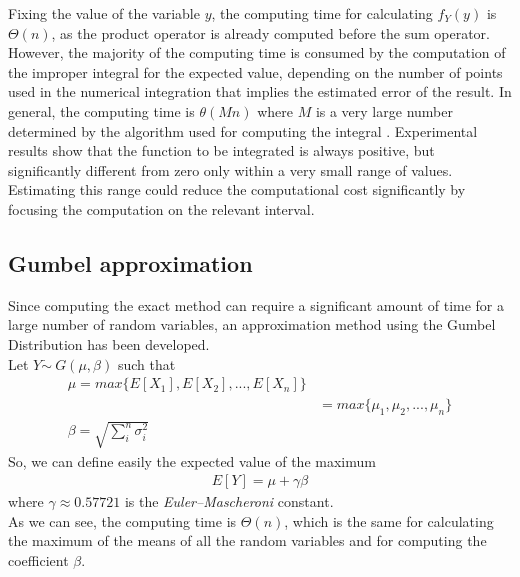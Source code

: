 Fixing the value of the variable $y$, the computing time for calculating $f_Y(y)$ is $\Theta(n)$, as the product operator is already computed before the sum operator. However, the majority of the computing time is consumed by the computation of the improper integral for the expected value, depending on the number of points used in the numerical integration that implies the estimated error of the result. In general, the computing time is $\theta(M n)$ where $M$ is a very large number determined by the algorithm used for computing the integral \cite{2020SciPy-NMeth}.
Experimental results show that the function to be integrated is always positive, but significantly different from zero only within a very small range of values. Estimating this range could reduce the computational cost significantly by focusing the computation on the relevant interval.

\subsection{Gumbel approximation}
Since computing the exact method can require a significant amount of time for a large number of random variables, an approximation method using the Gumbel Distribution has been developed. \\
Let $Y \dot \sim \ G(\mu, \beta)$ such that
\begin{align*}
	\mu = max\{E[X_1], E[X_2], ..., E[X_n]\} \\
	&= max\{\mu_1, \mu_2, ..., \mu_n\} \tag*{(since $X_i \sim N(\mu_i, \sigma_i^2)$)} \\
	\beta = \sqrt{\sum_{i}^n{\sigma_i^2}}
\end{align*}
So, we can define easily the expected value of the maximum
\begin{align*}
	E[Y] = \mu + \gamma \beta
\end{align*}
where $\gamma \approx 0.57721$ is the \textit{Euler–Mascheroni} constant. \\
As we can see, the computing time is $\Theta(n)$, which is the same for calculating the maximum of the means of all the random variables and for computing the coefficient $\beta$.